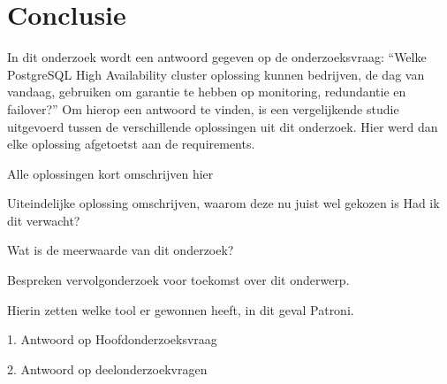 
\chapter{Conclusie}
\label{ch:conclusie}

In dit onderzoek wordt een antwoord gegeven op de onderzoeksvraag: “Welke PostgreSQL High Availability cluster oplossing kunnen bedrijven, de dag van vandaag, gebruiken om garantie te hebben op monitoring, redundantie en failover?” Om hierop een antwoord te vinden, is een vergelijkende studie uitgevoerd tussen de verschillende oplossingen uit dit onderzoek. Hier werd dan elke oplossing afgetoetst aan de requirements.

Alle oplossingen kort omschrijven hier

Uiteindelijke oplossing omschrijven, waarom deze nu juist wel gekozen is
Had ik dit verwacht?

Wat is de meerwaarde van dit onderzoek?

Bespreken vervolgonderzoek voor toekomst over dit onderwerp.

Hierin zetten welke tool er gewonnen heeft, in dit geval Patroni.

1. Antwoord op Hoofdonderzoeksvraag

2. Antwoord op deelonderzoekvragen



